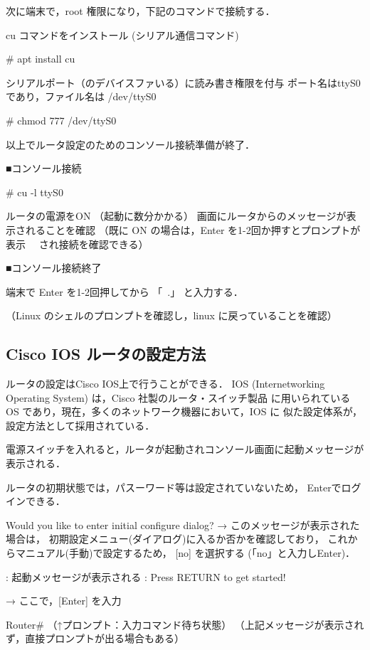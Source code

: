次に端末で，root 権限になり，下記のコマンドで接続する．
\begin{cli}
cu コマンドをインストール
(シリアル通信コマンド)

# apt install cu

シリアルポート（のデバイスファいる）に読み書き権限を付与
ポート名はttyS0であり，ファイル名は /dev/ttyS0

# chmod 777 /dev/ttyS0

以上でルータ設定のためのコンソール接続準備が終了．

■コンソール接続

# cu -l ttyS0

ルータの電源をON
（起動に数分かかる）
画面にルータからのメッセージが表示されることを確認
（既に ON の場合は，Enter を1-2回か押すとプロンプトが表示
　され接続を確認できる）

■コンソール接続終了

端末で Enter を1-2回押してから
「~.」
と入力する．

（Linux のシェルのプロンプトを確認し，linux に戻っていることを確認）

\end{cli}

\subsection{Cisco IOS ルータの設定方法}
ルータの設定はCisco IOS上で行うことができる．
IOS (Internetworking Operating System) は，Cisco 社製のルータ・スイッチ製品
に用いられている OS であり，現在，多くのネットワーク機器において，IOS に
似た設定体系が，設定方法として採用されている．

電源スイッチを入れると，ルータが起動されコンソール画面に起動メッセージが表示される．

ルータの初期状態では，パスーワード等は設定されていないため，
Enterでログインできる．

\begin{cli}
Would you like to enter initial configure dialog?
   → このメッセージが表示された場合は，
      初期設定メニュー(ダイアログ)に入るか否かを確認しており，
      これからマニュアル(手動)で設定するため，
      [no] を選択する (「no」と入力しEnter)．

     : 起動メッセージが表示される
     :
Press RETURN to get started!

  → ここで，[Enter] を入力

Router#
（↑プロンプト：入力コマンド待ち状態）
（上記メッセージが表示されず，直接プロンプトが出る場合もある）
\end{cli}

